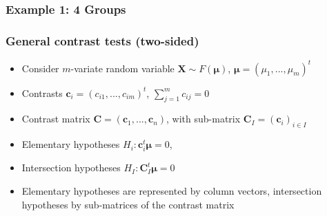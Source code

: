 \documentclass[bigger]{beamer}
\newcommand{\bs}[1]{\bm{#1}}
\begin{document}
\begin{frame}
\frametitle{Example 1: 4 Groups}

\end{frame}



% 



\begin{frame}
\frametitle{General contrast tests (two-sided)}
\begin{itemize}

\item Consider $m$-variate random variable $\bs{X} \sim F(\bs{\mu})$, $\bs{\mu} = (\mu_1,...,\mu_m)^t$

\item Contrasts $\bs{c}_i = (c_{i1},...,c_{im})^t$, $\sum_{j = 1}^m
  c_{ij} = 0$
\item Contrast matrix  $\bs{C} = \left( \bs{c}_1,...,\bs{c}_n\right)$,
  with sub-matrix $\bs{C}_I = \left( \bs{c}_i \right)_{i \in
    I}$
\item Elementary hypotheses $H_i: \bs{c}_i^t\bs{\mu} = 0$,
\item Intersection hypotheses $H_I: \bs{C}_I^t\bs{\mu} = 0$

\item Elementary hypotheses are represented by column vectors,
  intersection hypotheses by sub-matrices of the contrast matrix

\end{itemize} %
\end{frame}
\end{document}
